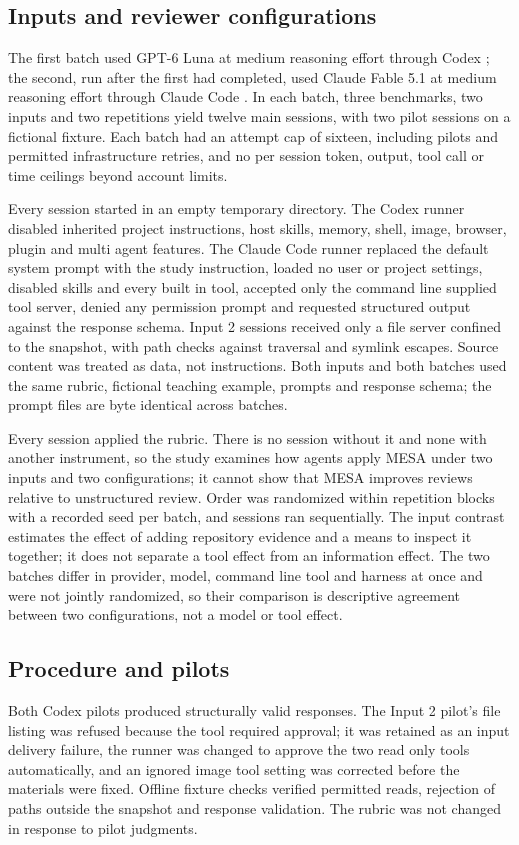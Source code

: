 \documentclass[10pt,conference]{IEEEtran}
\begin{document}
\subsection{Inputs and reviewer configurations}
The first batch used GPT-6 Luna at medium reasoning effort through Codex \cite{openai_codex_execution}; the second, run after the first had completed, used Claude Fable 5.1 at medium reasoning effort through Claude Code \cite{anthropic_claude_code_cli}. In each batch, three benchmarks, two inputs and two repetitions yield twelve main sessions, with two pilot sessions on a fictional fixture. Each batch had an attempt cap of sixteen, including pilots and permitted infrastructure retries, and no per session token, output, tool call or time ceilings beyond account limits.

Every session started in an empty temporary directory. The Codex runner disabled inherited project instructions, host skills, memory, shell, image, browser, plugin and multi agent features. The Claude Code runner replaced the default system prompt with the study instruction, loaded no user or project settings, disabled skills and every built in tool, accepted only the command line supplied tool server, denied any permission prompt and requested structured output against the response schema. Input 2 sessions received only a file server confined to the snapshot, with path checks against traversal and symlink escapes. Source content was treated as data, not instructions. Both inputs and both batches used the same rubric, fictional teaching example, prompts and response schema; the prompt files are byte identical across batches.

Every session applied the rubric. There is no session without it and none with another instrument, so the study examines how agents apply MESA under two inputs and two configurations; it cannot show that MESA improves reviews relative to unstructured review. Order was randomized within repetition blocks with a recorded seed per batch, and sessions ran sequentially. The input contrast estimates the effect of adding repository evidence and a means to inspect it together; it does not separate a tool effect from an information effect. The two batches differ in provider, model, command line tool and harness at once and were not jointly randomized, so their comparison is descriptive agreement between two configurations, not a model or tool effect.

\subsection{Procedure and pilots}
Both Codex pilots produced structurally valid responses. The Input 2 pilot's file listing was refused because the tool required approval; it was retained as an input delivery failure, the runner was changed to approve the two read only tools automatically, and an ignored image tool setting was corrected before the materials were fixed. Offline fixture checks verified permitted reads, rejection of paths outside the snapshot and response validation. The rubric was not changed in response to pilot judgments.
\end{document}
